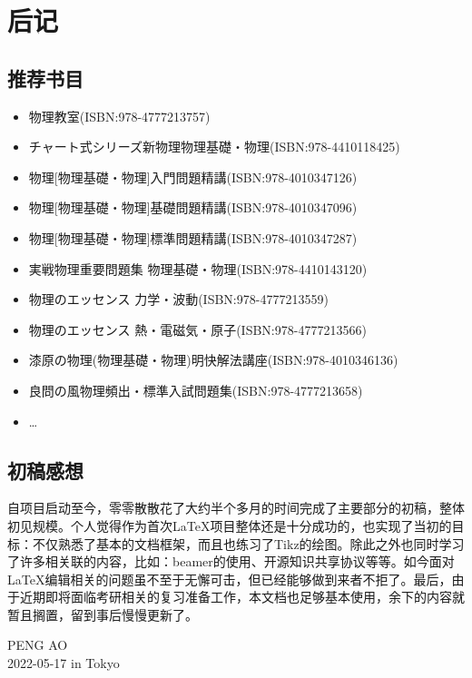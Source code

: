 
\chapter{后记}

\section*{推荐书目}
\begin{itemize}
    \item 物理教室(ISBN:978-4777213757)
    \item チャート式シリーズ新物理物理基礎・物理(ISBN:978-4410118425)
    \item 物理[物理基礎・物理]入門問題精講(ISBN:978-4010347126)
    \item 物理[物理基礎・物理]基礎問題精講(ISBN:978-4010347096)
    \item 物理[物理基礎・物理]標準問題精講(ISBN:978-4010347287)
    \item 実戦物理重要問題集 物理基礎・物理(ISBN:978-4410143120)
    \item 物理のエッセンス 力学・波動(ISBN:978-4777213559)
    \item 物理のエッセンス 熱・電磁気・原子(ISBN:978-4777213566)
    \item 漆原の物理(物理基礎・物理)明快解法講座(ISBN:978-4010346136)
    \item 良問の風物理頻出・標準入試問題集(ISBN:978-4777213658)
    \item \ldots
\end{itemize}

\section*{初稿感想}
自项目启动至今，零零散散花了大约半个多月的时间完成了主要部分的初稿，整体初见规模。个人觉得作为首次\LaTeX 项目整体还是十分成功的，也实现了当初的目标：不仅熟悉了基本的文档框架，而且也练习了Tikz的绘图。除此之外也同时学习了许多相关联的内容，比如：beamer的使用、开源知识共享协议等等。如今面对\LaTeX 编辑相关的问题虽不至于无懈可击，但已经能够做到来者不拒了。最后，由于近期即将面临考研相关的复习准备工作，本文档也足够基本使用，余下的内容就暂且搁置，留到事后慢慢更新了。

\begin{flushright}
    PENG AO\\
    2022-05-17 in Tokyo
\end{flushright}
